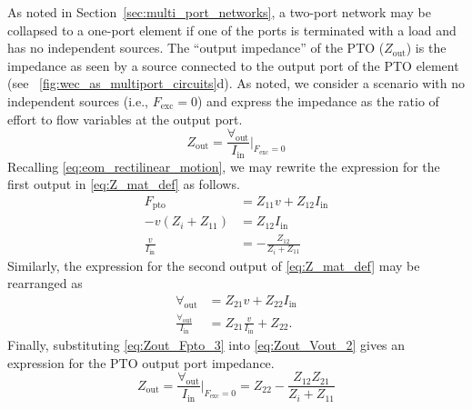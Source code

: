 \documentclass[5p,times]{elsarticle}
\begin{document}
As noted in Section~\ref{sec:multi_port_networks}, a two-port network may be collapsed to a one-port element if one of the ports is terminated with a load and has no independent sources.
The ``output impedance'' of the PTO ($Z_{\textrm{out}}$) is the impedance as seen by a source connected to the output port of the PTO element (see \figurename~\ref{fig:wec_as_multiport_circuits}d).
As noted, we consider a scenario with no independent sources (i.e., $F_{\textrm{exc}} = 0$) and express the impedance as the ratio of effort to flow variables at the output port. 
%
\begin{equation}
        Z_{\textrm{out}} = \frac{\forall_{\textrm{out}}}{I_{\textrm{in}}} \bigg\vert_{F_{\textrm{exc}}=0}
        \label{eq:Zout_1}
\end{equation}
%
Recalling \eqref{eq:eom_rectilinear_motion}, we may rewrite the expression for the first output in \eqref{eq:Z_mat_def} as follows.
%
\begin{subequations}
        \begin{align}
                F_{\textrm{pto}} &= Z_{11} v + Z_{12} I_{\textrm{in}} \label{eq:Zout_Fpto_1} \\[0.5em]
                -v (Z_i + Z_{11}) &= Z_{12} I_{\textrm{in}} \label{eq:Zout_Fpto_2} \\[0.5em]
                \frac{v}{I_{\textrm{in}}} &= -\frac{Z_{12}}{Z_i + Z_{11}} \label{eq:Zout_Fpto_3}
        \end{align}
        \label{eq:Zout_Fpto}%
\end{subequations}
%
Similarly, the expression for the second output of \eqref{eq:Z_mat_def} may be rearranged as
%
\begin{subequations}
        \begin{align}
                \forall_{\textrm{out}} &= Z_{21} v + Z_{22} I_{\textrm{in}} \label{eq:Zout_Vout_1} \\[0.5em]
                \frac{\forall_{\textrm{out}}}{I_{\textrm{in}}} &= Z_{21} \frac{v}{I_{\textrm{in}}} + Z_{22} . \label{eq:Zout_Vout_2}
        \end{align} 
        \label{eq:Zout_Vout}%
\end{subequations}
%
Finally, substituting \eqref{eq:Zout_Fpto_3} into \eqref{eq:Zout_Vout_2} gives an expression for the PTO output port impedance.
%
\begin{equation}
        Z_{\textrm{out}} = \frac{\forall_{\textrm{out}}}{I_{\textrm{in}}} \bigg\vert_{F_{\textrm{exc}}=0} = Z_{22} - \frac{Z_{12} Z_{21}}{Z_{i} + Z_{11}}
        \label{eq:pto_output_port_impedance}
\end{equation}
\end{document}
